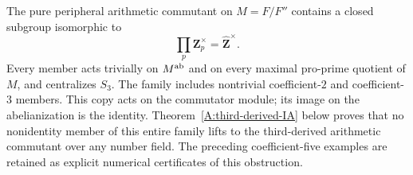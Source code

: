 \begin{proposition}
\label{A:metabelian-unit-family}
The pure peripheral arithmetic commutant on $M=F/F''$
contains a closed subgroup isomorphic to
\[
                    \prod_p\mathbf Z_p^\times
                         =\widehat{\mathbf Z}^{\times}.
\]
Every member acts trivially on $M^{\rm ab}$ and on every
maximal pro-prime quotient of $M$, and centralizes $S_3$.
The family includes nontrivial coefficient-$2$ and
coefficient-$3$ members. This copy acts on the commutator
module; its image on the abelianization is the identity.
Theorem~\ref{A:third-derived-IA} below proves that no
nonidentity member of this entire family lifts to the
third-derived arithmetic commutant over any number field.
The preceding coefficient-five examples are retained
as explicit numerical certificates of this obstruction.
\end{proposition}
